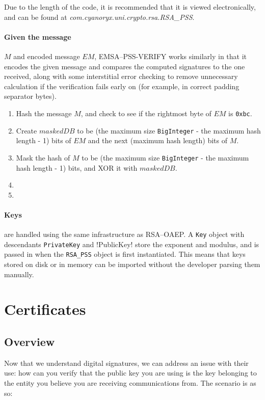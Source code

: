     Due to the length of the code, it is recommended that it is viewed electronically, and can be found at \emph{com.cyanoryx.uni.crypto.rsa.RSA\_PSS}.
    
    \paragraph{Given the message} $M$ and encoded message $EM$, EMSA--PSS-VERIFY works similarly in that it encodes the given message and compares the computed signatures to the one received, along with some interstitial error checking to remove unnecessary calculation if the verification fails early on (for example, in correct padding separator bytes).
    
    \begin{enumerate}
      \item Hash the message $M$, and check to see if the rightmost byte of $EM$ is \verb!0xbc!.
      \item Create $maskedDB$ to be (the maximum size \verb!BigInteger! - the maximum hash length - 1) bits of $EM$ and the next (maximum hash length) bits of $M$.
      \item Mask the hash of $M$ to be (the maximum size \verb!BigInteger! - the maximum hash length - 1) bits, and XOR it with $maskedDB$.
      \item 
      \item
    \end{enumerate}
    
    \paragraph{Keys} are handled using the same infrastructure as RSA--OAEP. A \verb!Key! object with descendants \verb!PrivateKey! and !PublicKey! store the exponent and modulus, and is passed in when the \verb!RSA_PSS! object is first instantiated. This means that keys stored on disk or in memory can be imported without the developer parsing them manually.

\section{Certificates}
\label{sec:certs}

  \subsection{Overview}
  
  Now that we understand digital signatures, we can address an issue with their use: how can you verify that the public key you are using is the key belonging to the entity you believe you are receiving communications from. The scenario is as so: 
  
